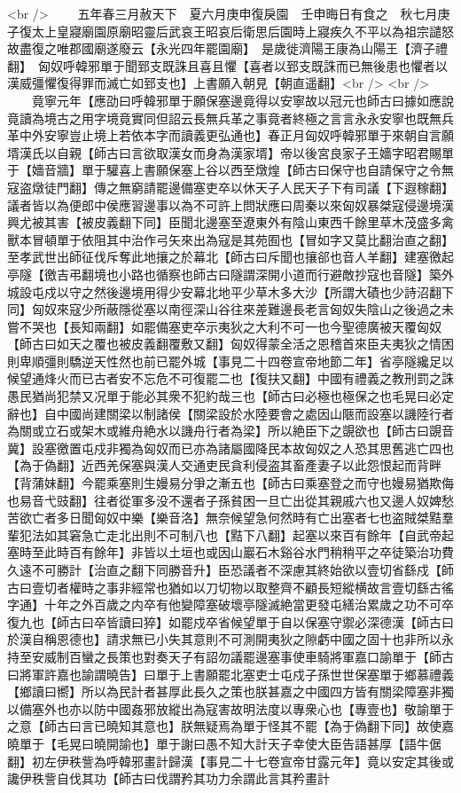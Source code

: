 <br />
　　五年春三月赦天下　夏六月庚申復戾園　壬申晦日有食之　秋七月庚子復太上皇寢廟園原廟昭靈后武哀王昭哀后衛思后園時上寢疾久不平以為祖宗譴怒故盡復之唯郡國廟遂廢云【永光四年罷園廟】　是歲徙濟陽王康為山陽王【濟子禮翻】　匈奴呼韓邪單于聞郅支既誅且喜且懼【喜者以郅支既誅而已無後患也懼者以漢威彊懼復得罪而滅亡如郅支也】上書願入朝見【朝直遥翻】<br />
<br />
　　竟寧元年【應劭曰呼韓邪單于願保塞邊竟得以安寧故以冠元也師古曰據如應說竟讀為境古之用字境竟實同但詔云長無兵革之事竟者終極之言言永永安寧也既無兵革中外安寧豈止境上若依本字而讀義更弘通也】春正月匈奴呼韓邪單于來朝自言願壻漢氏以自親【師古曰言欲取漢女而身為漢家壻】帝以後宮良家子王嬙字昭君賜單于【嬙音牆】單于驩喜上書願保塞上谷以西至燉煌【師古曰保守也自請保守之令無寇盗燉徒門翻】傳之無窮請罷邊備塞吏卒以休天子人民天子下有司議【下遐稼翻】議者皆以為便郎中侯應習邊事以為不可許上問狀應曰周秦以來匈奴暴桀寇侵邊境漢興尤被其害【被皮義翻下同】臣聞北邊塞至遼東外有陰山東西千餘里草木茂盛多禽獸本冒頓單于依阻其中治作弓矢來出為寇是其苑囿也【冒如字又莫比翻治直之翻】至孝武世出師征伐斥奪此地攘之於幕北【師古曰斥聞也攘郤也音人羊翻】建塞徼起亭隧【徼吉弔翻境也小路也循察也師古曰隧謂深開小道而行避敵抄寇也音隧】築外城設屯戍以守之然後邊境用得少安幕北地平少草木多大沙【所謂大磧也少詩沼翻下同】匈奴來寇少所蔽隱從塞以南徑深山谷往來差難邊長老言匈奴失陰山之後過之未嘗不哭也【長知兩翻】如罷備塞吏卒示夷狄之大利不可一也今聖德廣被天覆匈奴【師古曰如天之覆也被皮義翻覆敷又翻】匈奴得蒙全活之恩稽首來臣夫夷狄之情困則卑順彊則驕逆天性然也前已罷外城【事見二十四卷宣帝地節二年】省亭隧纔足以候望通烽火而已古者安不忘危不可復罷二也【復扶又翻】中國有禮義之教刑罰之誅愚民猶尚犯禁又况單于能必其衆不犯約哉三也【師古曰必極也極保之也毛晃曰必定辭也】自中國尚建關梁以制諸侯【關梁設於水陸要會之處因山陿而設塞以譏陸行者為關或立石或架木或維舟絶水以譏舟行者為梁】所以絶臣下之覬欲也【師古曰覬音冀】設塞徼置屯戍非獨為匈奴而已亦為諸屬國降民本故匈奴之人恐其思舊逃亡四也【為于偽翻】近西羌保塞與漢人交通吏民貪利侵盗其畜產妻子以此怨恨起而背畔【背蒲妹翻】今罷乘塞則生嫚易分爭之漸五也【師古曰乘塞登之而守也嫚易猶欺侮也易音弋豉翻】往者從軍多没不還者子孫貧困一旦亡出從其親戚六也又邊人奴婢愁苦欲亡者多日聞匈奴中樂【樂音洛】無奈候望急何然時有亡出塞者七也盗賊桀黠羣輩犯法如其窘急亡走北出則不可制八也【黠下八翻】起塞以來百有餘年【自武帝起塞時至此時百有餘年】非皆以土垣也或因山巖石木谿谷水門稍稍平之卒徒築治功費久遠不可勝計【治直之翻下同勝音升】臣恐議者不深慮其終始欲以壹切省繇戍【師古曰壹切者權時之事非經常也猶如以刀切物以取整齊不顧長短縱横故言壹切繇古徭字通】十年之外百歲之内卒有他變障塞破壞亭隧滅絶當更發屯繕治累歲之功不可卒復九也【師古曰卒皆讀曰猝】如罷戍卒省候望單于自以保塞守禦必深德漢【師古曰於漢自稱恩德也】請求無已小失其意則不可測開夷狄之隙虧中國之固十也非所以永持至安威制百蠻之長策也對奏天子有詔勿議罷邊塞事使車騎將軍嘉口諭單于【師古曰將軍許嘉也諭謂曉告】曰單于上書願罷北塞吏士屯戍子孫世世保塞單于鄉慕禮義【鄉讀曰嚮】所以為民計者甚厚此長久之策也朕甚嘉之中國四方皆有關梁障塞非獨以備塞外也亦以防中國姦邪放縱出為寇害故明法度以專衆心也【專壹也】敬諭單于之意【師古曰言已曉知其意也】朕無疑焉為單于怪其不罷【為于偽翻下同】故使嘉曉單于【毛晃曰曉開諭也】單于謝曰愚不知大計天子幸使大臣告語甚厚【語牛倨翻】初左伊秩訾為呼韓邪畫計歸漢【事見二十七卷宣帝甘露元年】竟以安定其後或讒伊秩訾自伐其功【師古曰伐謂矜其功力余謂此言其矜畫計